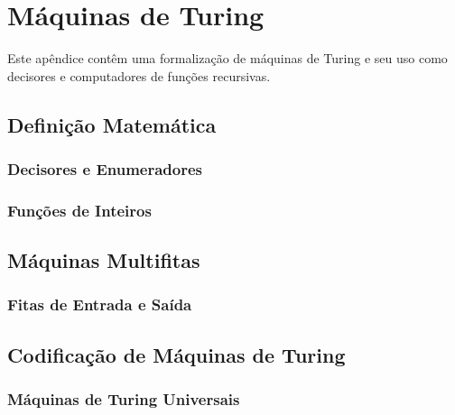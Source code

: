 \chapter{Máquinas de Turing}
\label{app:turing_machines}

Este apêndice contêm uma formalização de máquinas de Turing
e seu uso como decisores e computadores de funções recursivas.

\section{Definição Matemática}

\subsection{Decisores e Enumeradores}

\subsection{Funções de Inteiros}

\section{Máquinas Multifitas}

\subsection{Fitas de Entrada e Saída}

\section{Codificação de Máquinas de Turing}

\subsection{Máquinas de Turing Universais}
